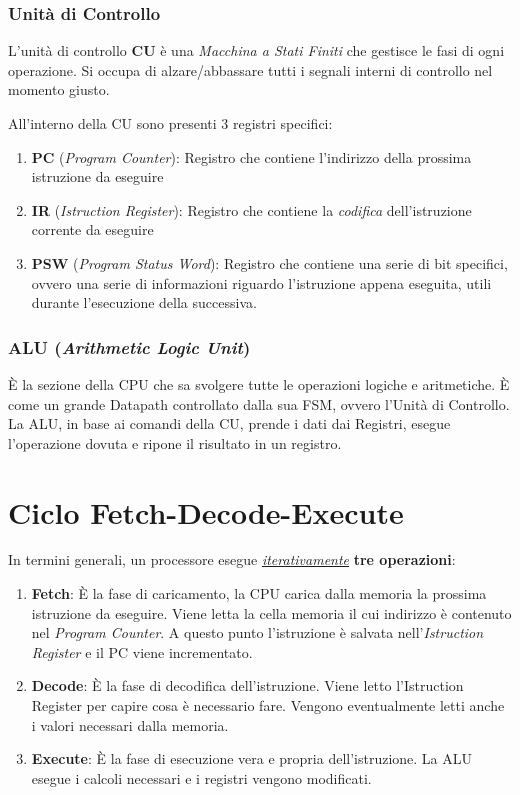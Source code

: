 \documentclass[a4paper,11pt,oneside]{book}
\begin{document}
\subsubsection{Unità di Controllo}
L'unità di controllo \textbf{CU} è una \emph{Macchina a Stati Finiti} che gestisce le fasi di ogni operazione. Si occupa di alzare/abbassare tutti i segnali interni di controllo
nel momento giusto.

All'interno della CU sono presenti 3 registri specifici:
\begin{enumerate}
    \item \textbf{PC} (\emph{Program Counter}): Registro che contiene l'indirizzo della prossima istruzione da eseguire
    \item \textbf{IR} (\emph{Istruction Register}): Registro che contiene la \emph{codifica} dell'istruzione corrente da eseguire
    \item \textbf{PSW} (\emph{Program Status Word}): Registro che contiene una serie di bit specifici, ovvero una serie di informazioni riguardo l'istruzione appena
          eseguita, utili durante l'esecuzione della successiva.
\end{enumerate}

\subsubsection{ALU (\emph{Arithmetic Logic Unit})}
È la sezione della CPU che sa svolgere tutte le operazioni logiche e aritmetiche. È come un grande Datapath controllato dalla sua FSM, ovvero l'Unità di Controllo.
La ALU, in base ai comandi della CU, prende i dati dai Registri, esegue l'operazione dovuta e ripone il risultato in un registro.

\section{Ciclo Fetch-Decode-Execute}
In termini generali, un processore esegue \underline{\emph{iterativamente}} \textbf{tre operazioni}:
\begin{enumerate}
    \item \textbf{Fetch}: È la fase di caricamento, la CPU carica dalla memoria la prossima istruzione da eseguire.
          Viene letta la cella memoria il cui indirizzo è contenuto nel \emph{Program Counter}. A questo punto l'istruzione è salvata nell'\emph{Istruction Register} e il PC viene incrementato.
    \item \textbf{Decode}: È la fase di decodifica dell'istruzione. Viene letto l'Istruction Register per capire cosa è necessario fare. Vengono eventualmente letti anche i valori necessari dalla memoria.
    \item \textbf{Execute}: È la fase di esecuzione vera e propria dell'istruzione. La ALU esegue i calcoli necessari e i registri vengono modificati.
\end{enumerate}
\end{document}
